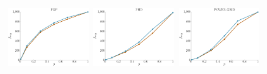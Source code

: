 \documentclass[a4paper]{report}
\newcommand{\wratio}{0.16}
\begin{document}
\includegraphics[width=\wratio\textwidth]{influence/PGP/fs_pgp}\hfill
\includegraphics[width=\wratio\textwidth]{influence/PHD/fs_phd}\hfill
\vfill
\includegraphics[width=\wratio\textwidth]{influence/POWER_GRID/fs_power_grid}\hfill
\end{document}
